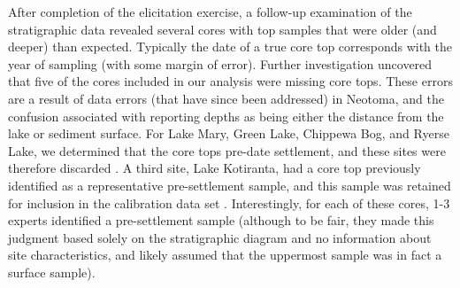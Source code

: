 \documentclass[12pt]{article}
\begin{document}
After completion of the elicitation exercise, a follow-up examination
of the stratigraphic data revealed several cores with top samples that
were older (and deeper) than expected. Typically the date of a true
core top corresponds with the year of sampling (with some margin of
error). Further investigation uncovered that five of the cores
included in our analysis were missing core tops. These errors are a
result of data errors (that have since been addressed) in Neotoma, and
the confusion associated with reporting depths as being either the
distance from the lake or sediment surface. For Lake Mary, Green Lake,
Chippewa Bog, and Ryerse Lake, we determined that the core tops
pre-date settlement, and these sites were therefore discarded
\citep{webb1971late, lawrenz1975}. A third site, Lake Kotiranta, had a
core top previously identified as a representative pre-settlement
sample, and this sample was retained for inclusion in the calibration
data set \citep{wright1969}. Interestingly, for each of these cores,
1-3 experts identified a pre-settlement sample (although to be fair,
they made this judgment based solely on the stratigraphic diagram and
no information about site characteristics, and likely assumed that the
uppermost sample was in fact a surface sample).

\end{document}
